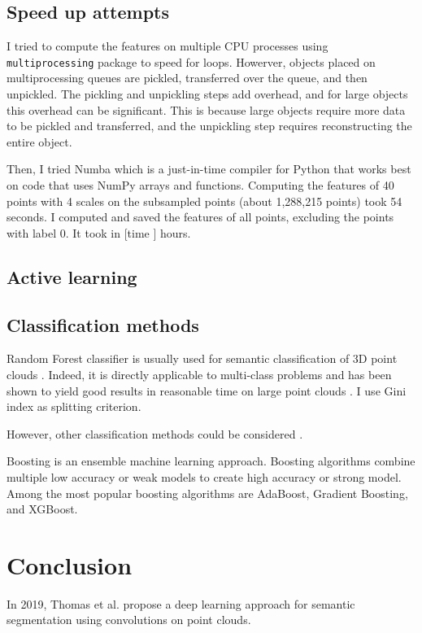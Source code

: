 \documentclass[a4paper, 11pt]{article}
\begin{document}
\subsection{Speed up attempts}
I tried to compute the features on multiple CPU processes using \texttt{multiprocessing} package to speed for loops. Howerver, objects placed on multiprocessing queues are pickled, transferred over the queue, and then unpickled. The pickling and unpickling steps add overhead, and for large objects this overhead can be significant. This is because large objects require more data to be pickled and transferred, and the unpickling step requires reconstructing the entire object. 

Then, I tried Numba which is a just-in-time compiler for Python that works best on code that uses NumPy arrays and functions. Computing the features of 40 points with 4 scales on the subsampled points (about 1,288,215 points) took 54 seconds. I computed and saved the features of all points, excluding the points with label 0. It took in [time ] hours. 

\subsection{Active learning}

\subsection{Classification methods}
Random Forest classifier is usually used for semantic classification of 3D point clouds \cite{thomas_semantic_2018,hackel_fast_nodate}. Indeed, it is directly applicable to multi-class problems and has been shown to yield good results in reasonable time on large point clouds \cite{weinmann_semantic_2015,atik_machine_2021}. I use Gini index as splitting criterion.

However, other classification methods could be considered \cite{atik_machine_2021}. 

Boosting is an ensemble machine learning approach. Boosting algorithms combine multiple low accuracy or weak models to create high accuracy or strong model. Among the most popular boosting algorithms are AdaBoost, Gradient Boosting, and XGBoost.

\section{Conclusion}

In 2019, Thomas et al. \cite{thomas_kpconv_2019} propose a deep learning approach for semantic segmentation using convolutions on point clouds.
\printbibliography
\end{document}
